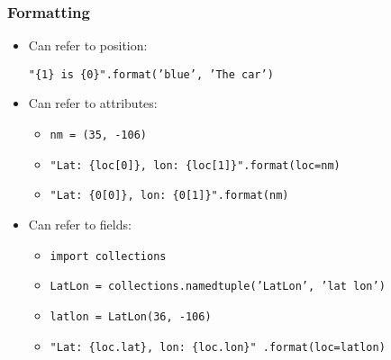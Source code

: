 \documentclass{beamer}
\begin{document}
%
%
\begin{frame}
  \frametitle{Formatting}
  \begin{itemize}
    \item Can refer to position:
    \begin{itemize}
      \texttt{"\{1\} is \{0\}".format('blue', 'The car')}
    \end{itemize}
    \item Can refer to attributes: 
    \begin{itemize}
      \item \texttt{nm = (35, -106)}
      \item \texttt{"Lat: \{loc[0]\}, lon: \{loc[1]\}".format(loc=nm)}
      \item \texttt{"Lat: \{0[0]\}, lon: \{0[1]\}".format(nm)}
    \end{itemize}
    \item Can refer to fields:
    \begin{itemize}
      \item \texttt{import collections}
      \item \texttt{LatLon = collections.namedtuple('LatLon', 'lat lon')}
      \item \texttt{latlon = LatLon(36, -106)}
      \item \texttt{"Lat: \{loc.lat\}, lon: \{loc.lon\}" .format(loc=latlon)}
    \end{itemize}
  \end{itemize}
\end{frame}
\end{document}
